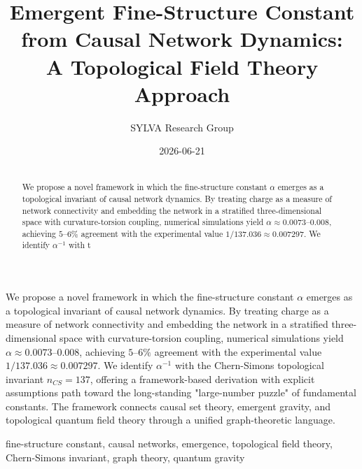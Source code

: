 \documentclass[11pt,a4paper]{article}
\title{Emergent Fine-Structure Constant from Causal Network Dynamics: \\
        A Topological Field Theory Approach}
\author{SYLVA Research Group}
\date{2026-06-21}
\theoremstyle{plain}
\theoremstyle{definition}
\begin{document}
\maketitle

\begin{abstract}
\section{\1}

We propose a novel framework in which the fine-structure constant $\alpha$ emerges as a topological invariant of causal network dynamics. By treating charge as a measure of network connectivity and embedding the network in a stratified three-dimensional space with curvature-torsion coupling, numerical simulations yield $\alpha \approx 0.0073\text{--}0.008$, achieving $5\text{--}6\%$ agreement with the experimental value $1/137.036 \approx 0.007297$. We identify $\alpha^{-1}$ with t
\end{abstract}

\tableofcontents
\newpage

\section{\1}

We propose a novel framework in which the fine-structure constant $\alpha$ emerges as a topological invariant of causal network dynamics. By treating charge as a measure of network connectivity and embedding the network in a stratified three-dimensional space with curvature-torsion coupling, numerical simulations yield $\alpha \approx 0.0073\text{--}0.008$, achieving $5\text{--}6\%$ agreement with the experimental value $1/137.036 \approx 0.007297$. We identify $\alpha^{-1}$ with the Chern-Simons topological invariant $n_{CS} = 137$, offering a framework-based derivation with explicit assumptions path toward the long-standing "large-number puzzle" of fundamental constants. The framework connects causal set theory, emergent gravity, and topological quantum field theory through a unified graph-theoretic language.

\textbf{\1} fine-structure constant, causal networks, emergence, topological field theory, Chern-Simons invariant, graph theory, quantum gravity

\textemdash{}

\section{\1}
\end{document}
